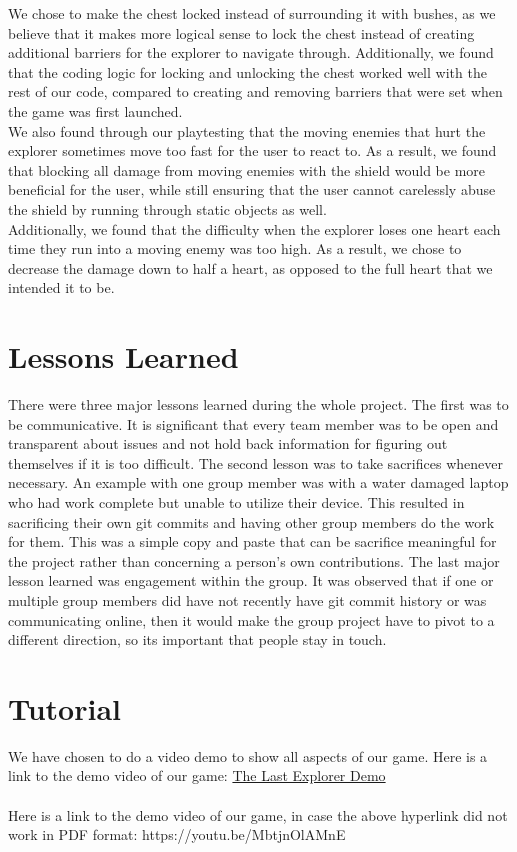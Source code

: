 \documentclass[12pt,letterpaper]{article}
\begin{document}
We chose to make the chest locked instead of surrounding it with bushes, as we believe that it makes more logical sense to lock the chest instead of creating additional barriers for the explorer to navigate through. Additionally, we found that the coding logic for locking and unlocking the chest worked well with the rest of our code, compared to creating and removing barriers that were set when the game was first launched. \\

We also found through our playtesting that the moving enemies that hurt the explorer sometimes move too fast for the user to react to. As a result, we found that blocking all damage from moving enemies with the shield would be more beneficial for the user, while still ensuring that the user cannot carelessly abuse the shield by running through static objects as well. \\

Additionally, we found that the difficulty when the explorer loses one heart each time they run into a moving enemy was too high. As a result, we chose to decrease the damage down to half a heart, as opposed to the full heart that we intended it to be. \\

\section{Lessons Learned}
There were three major lessons learned during the whole project. The first was to be communicative. It is significant that every team member was to be open and transparent about issues and not hold back information for figuring out themselves if it is too difficult. The second lesson was to take sacrifices whenever necessary. An example with one group member was with a water damaged laptop who had work complete but unable to utilize their device. This resulted in sacrificing their own git commits and having other group members do the work for them. This was a simple copy and paste that can be sacrifice meaningful for the project rather than concerning a person’s own contributions. The last major lesson learned was engagement within the group. It was observed that if one or multiple group members did have not recently have git commit history or was communicating online, then it would make the group project have to pivot to a different direction, so its important that people stay in touch. 

\section{Tutorial}

We have chosen to do a video demo to show all aspects of our game. Here is a link to the demo video of our game:
\href{https://youtu.be/MbtjnOlAMnE}{The Last Explorer Demo} \\ \\
Here is a link to the demo video of our game, in case the above hyperlink did not work in PDF format: https://youtu.be/MbtjnOlAMnE


\end{document}
